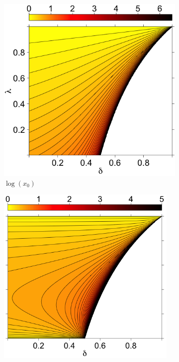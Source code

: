 \documentclass[11pt]{article}
\theoremstyle{definition}
\theoremstyle{definition}
\begin{document}
\begin{figure}[t]
\hspace{-1.2em}
        \centering
        \begin{subfigure}[b]{0.33\textwidth}
                \includegraphics[width=1.07\textwidth, height = \textwidth]{ExtremeX0}
\caption{$\log(x_0)$}	
\label{xOracle}
        \end{subfigure}%
\hspace{0.6em}
        \begin{subfigure}[b]{0.33\textwidth}
                \includegraphics[width= 0.95\textwidth, height = \textwidth]{ExtremeGamma}

\end{subfigure}
\end{figure}
\end{document}
